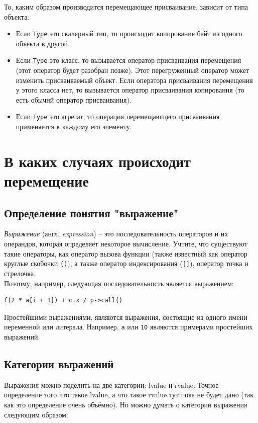 \documentclass{article}
\begin{document}
То, каким образом производится перемещающее присваивание, зависит от типа объекта:
\begin{itemize}
\item Если \texttt{Type} это скалярный тип, то происходит копирование байт из одного объекта в другой.
\item Если \texttt{Type} это класс, то вызывается оператор присваивания перемещения (этот оператор будет разобран позже). Этот перегруженный оператор может изменить присваиваемый объект. Если оператора присваивания перемещения у этого класса нет, то вызывается оператор присваивания копирования (то есть обычнй оператор присваивания).
\item Если \texttt{Type} это агрегат, то операция перемещающего присваивания применяется к каждому его элементу.
\end{itemize}

\newpage
\section*{В каких случаях происходит перемещение}
\subsection*{Определение понятия "выражение"}
\textit{Выражение} (англ. \textit{expression}) -- это последовательность операторов и их операндов, которая определяет некоторое вычисление. Учтите, что существуют такие операторы, как оператор вызова функции (также известный как оператор круглые скобочки \texttt{()}), а также оператор индексирования (\texttt{[]}), оператор точка и стрелочка.\\
Поэтому, например, следующая последовательность является выражением:
\begin{lstlisting}
f(2 * a[i + 1]) + c.x / p->call()
\end{lstlisting}
Простейшими выражениями, являются выражения, состоящие из одного имени переменной или литерала. Например, \texttt{a} или \texttt{10} являются примерами простейших выражений.

\subsection*{Категории выражений}
Выражения можно поделить на две категории: lvalue и rvalue. Точное определение того что такое lvalue, а что такое rvalue тут пока не будет дано (так как это определение очень объёмно).
Но можно думать о категории выражения следующим образом:
\end{document}
